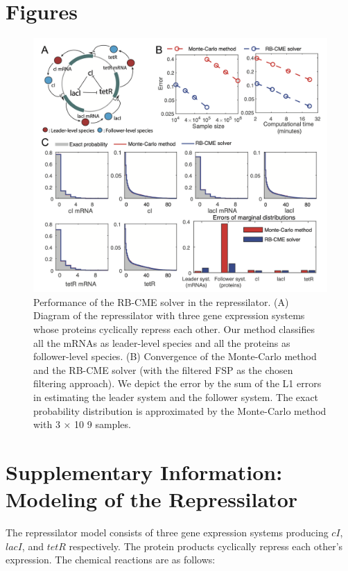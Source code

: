 \documentclass[11pt]{isr} %
\begin{document}


\newpage

\appendix
\section{Figures}

\begin{figure}[h]
\begin{center}
\includegraphics[width=6in]{isr/figs/represillator.png}
\caption{Performance of the RB-CME solver in the repressilator. (A) Diagram of the
repressilator with three gene expression systems whose proteins cyclically repress
each other. Our method classifies all the mRNAs as leader-level species and all the
proteins as follower-level species. (B) Convergence of the Monte-Carlo method and
the RB-CME solver (with the filtered FSP as the chosen filtering approach). We depict
the error by the sum of the L1 errors in estimating the leader system and the follower
system. The exact probability distribution is approximated by the Monte-Carlo method
with 3 × 10
9 samples.}
\end{center}
\end{figure}

\newpage

\section{Supplementary Information: Modeling of the Repressilator}
The repressilator model consists of three gene expression systems producing \( cI \), \( lacI \), and \( tetR \) respectively. The protein products cyclically repress each other’s expression. The chemical reactions are as follows:
\end{document}
